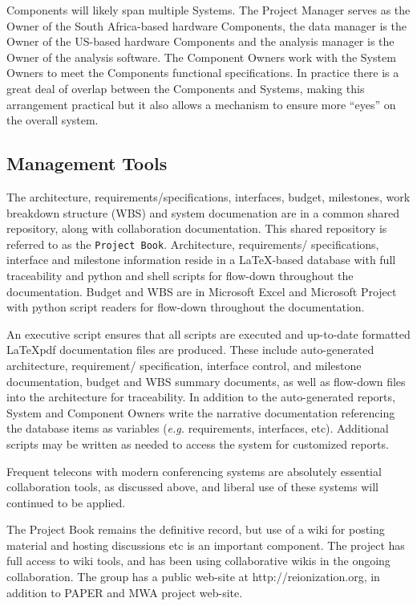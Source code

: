 \documentclass[preprint]{aastex}
\begin{document}
Components will likely span multiple Systems. The Project
Manager serves as the Owner of the South Africa-based hardware Components, the data
manager is the Owner of the US-based hardware Components and the analysis manager is 
the Owner of the analysis software.  The Component Owners work with the System Owners 
to meet the Components functional specifications.  In practice there is a great deal of overlap
between the Components and Systems, making this arrangement practical but it also allows
a mechanism to ensure more ``eyes'' on the overall system.

\subsection{Management Tools}
The architecture, requirements/specifications, interfaces, budget, milestones, work breakdown structure
(WBS) and system documenation are in a common shared repository, along with collaboration
documentation.  This shared repository is referred to as the {\tt Project Book}.  Architecture, requirements/ 
specifications, interface and milestone information reside in a \LaTeX-based database with full traceability
and python and shell scripts for flow-down throughout the documentation.  Budget and WBS are in Microsoft
Excel and Microsoft Project with python script readers for flow-down throughout the documentation.

An executive script ensures that all scripts are executed and up-to-date formatted \LaTeX pdf documentation
files are produced.  These include auto-generated architecture, requirement/ specification, 
interface control, and milestone documentation, budget and WBS summary documents, as well as
flow-down files into the architecture for traceability. 
In addition to the auto-generated reports, System and  Component Owners write the narrative 
documentation referencing the database items as variables ({\em e.g.} requirements, interfaces, etc).
Additional scripts may be written as needed to access the system for customized reports.

Frequent telecons with modern conferencing systems are absolutely essential collaboration tools, 
as discussed above, and liberal use of these systems will continued to be applied.

The Project Book remains the definitive record, but use of a wiki for posting material and hosting
discussions etc is an important component.  The project has full access to wiki tools, and has been
using collaborative wikis in the ongoing collaboration.  The group has a public web-site at http://reionization.org, 
in addition to PAPER and MWA project web-site.
\end{document}
